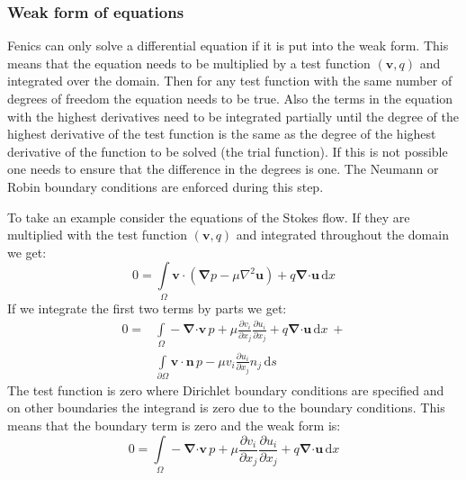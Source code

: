 \documentclass[12pt, a4paper]{article}
\begin{document}
\subsubsection{Weak form of equations}
Fenics can only solve a differential equation if it is put into the weak form. This means that the equation needs to be multiplied by a test function $(\mathbf{v}, q)$ and integrated over the domain. Then for any test function with the same number of degrees of freedom the equation needs to be true. Also the terms in the equation with the highest derivatives need to be integrated partially until the degree of the highest derivative of the test function is the same as the degree of the highest derivative of the function to be solved (the trial function). If this is not possible one needs to ensure that the difference in the degrees is one. The Neumann or Robin boundary conditions are enforced during this step.

To take an example consider the equations of the Stokes flow. If they are multiplied with the test function $(\mathbf{v}, q)$ and integrated throughout the domain we get:
\begin{equation}
0 = \int\limits_{\Omega}
\mathbf{v \cdot} \left(
\boldsymbol{\nabla} p - \mu \nabla^2 \mathbf{u}
\right) +
q \boldsymbol{\nabla} \mathbf{\cdot u}
\, \mathrm{d}x
\end{equation}
If we integrate the first two terms by parts we get:
\begin{equation}
\begin{split}
0 = &\int\limits_{\Omega}
- \boldsymbol{\nabla} \mathbf{\cdot v} \, p  +
\mu \frac{\partial v_i}{\partial x_j} \frac{\partial u_i}{\partial x_j} +
q \boldsymbol{\nabla} \mathbf{\cdot u}
\, \mathrm{d}x \ + \\
&\int\limits_{\partial \Omega}
\mathbf{v \cdot n} \, p - 
\mu v_i \frac{\partial u_i}{\partial x_j} n_j
\, \mathrm{d}s
\end{split}
\end{equation}
The test function is zero where Dirichlet boundary conditions are specified and on other boundaries the integrand is zero due to the boundary conditions. This means that the boundary term is zero and the weak form is:
\begin{equation}
0 = \int\limits_{\Omega}
- \boldsymbol{\nabla} \mathbf{\cdot v} \, p  +
\mu \frac{\partial v_i}{\partial x_j} \frac{\partial u_i}{\partial x_j} +
q \boldsymbol{\nabla} \mathbf{\cdot u}
\, \mathrm{d}x
\end{equation}
\end{document}
